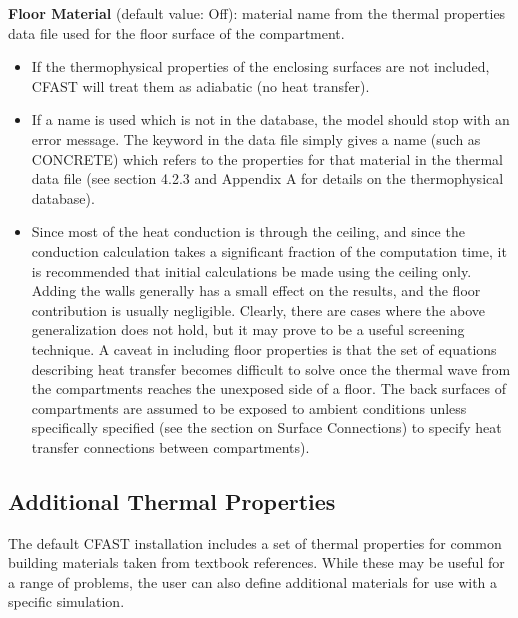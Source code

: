 \textbf{Floor Material} (default value: Off): material name from the thermal properties data file used for the floor surface of the compartment.

\begin{itemize}
\item If the thermophysical properties of the enclosing surfaces are not included, CFAST will treat them as adiabatic (no heat transfer).

\item If a name is used which is not in the database, the model should stop with an error message. The keyword in the data file simply gives a name (such as CONCRETE) which refers to the properties for that material in the thermal data file (see section 4.2.3 and Appendix A for details on the thermophysical database).

\item Since most of the heat conduction is through the ceiling, and since the conduction calculation takes a significant fraction of the computation time, it is recommended that initial calculations be made using the ceiling only.  Adding the walls generally has a small effect on the results, and the floor contribution is usually negligible.  Clearly, there are cases where the above generalization does not hold, but it may prove to be a useful screening technique. A caveat in including floor properties is that the set of equations describing heat transfer becomes difficult to solve once the thermal wave from the compartments reaches the unexposed side of a floor. The back surfaces of compartments are assumed to be exposed to ambient conditions unless specifically specified (see the section on Surface Connections) to specify heat transfer connections between compartments).
\end{itemize}

\subsection{Additional Thermal Properties}

The default CFAST installation includes a set of thermal properties for common building materials taken from textbook references.  While these may be useful for a range of problems, the user can also define additional materials for use with a specific simulation.

